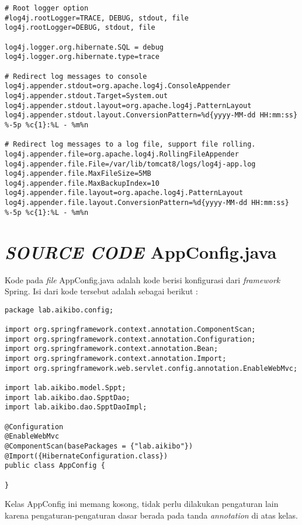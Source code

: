 \documentclass[pdftex,12pt, oneside]{article}
\begin{document}
\begin{lstlisting}
# Root logger option
#log4j.rootLogger=TRACE, DEBUG, stdout, file
log4j.rootLogger=DEBUG, stdout, file

log4j.logger.org.hibernate.SQL = debug
log4j.logger.org.hibernate.type=trace

# Redirect log messages to console
log4j.appender.stdout=org.apache.log4j.ConsoleAppender
log4j.appender.stdout.Target=System.out
log4j.appender.stdout.layout=org.apache.log4j.PatternLayout
log4j.appender.stdout.layout.ConversionPattern=%d{yyyy-MM-dd HH:mm:ss} %-5p %c{1}:%L - %m%n

# Redirect log messages to a log file, support file rolling.
log4j.appender.file=org.apache.log4j.RollingFileAppender
log4j.appender.file.File=/var/lib/tomcat8/logs/log4j-app.log
log4j.appender.file.MaxFileSize=5MB
log4j.appender.file.MaxBackupIndex=10
log4j.appender.file.layout=org.apache.log4j.PatternLayout
log4j.appender.file.layout.ConversionPattern=%d{yyyy-MM-dd HH:mm:ss} %-5p %c{1}:%L - %m%n
\end{lstlisting}


\section{\textit{SOURCE CODE} AppConfig.java}

Kode pada \textit{file} AppConfig.java adalah kode berisi konfigurasi dari \textit{framework} Spring. Isi dari kode tersebut adalah sebagai berikut :

\begin{lstlisting}
package lab.aikibo.config;

import org.springframework.context.annotation.ComponentScan;
import org.springframework.context.annotation.Configuration;
import org.springframework.context.annotation.Bean;
import org.springframework.context.annotation.Import;
import org.springframework.web.servlet.config.annotation.EnableWebMvc;

import lab.aikibo.model.Sppt;
import lab.aikibo.dao.SpptDao;
import lab.aikibo.dao.SpptDaoImpl;

@Configuration
@EnableWebMvc
@ComponentScan(basePackages = {"lab.aikibo"})
@Import({HibernateConfiguration.class})
public class AppConfig {

}
\end{lstlisting}

Kelas AppConfig ini memang kosong, tidak perlu dilakukan pengaturan lain karena pengaturan-pengaturan dasar berada pada tanda \textit{annotation} di atas kelas.
\end{document}
